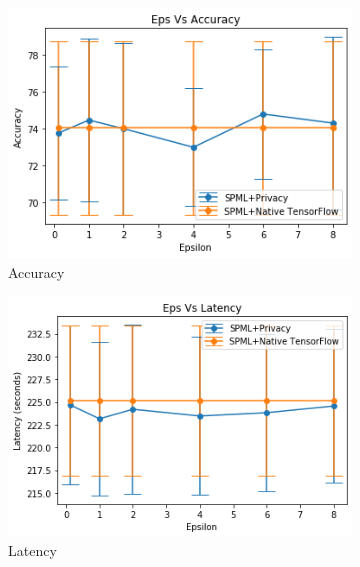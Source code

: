 \begin{figure}
\begin{subfigure}{0.5\textwidth}
         \includegraphics[width=\textwidth]{images/RR/simAccuracy.png}
         \caption{Accuracy}
         \label{fig:simRRAccuracyInference}
     \end{subfigure}
     \begin{subfigure}{0.5\textwidth}
         \includegraphics[width=\textwidth]{images/RR/simLatency.png}
         \caption{Latency}
         \label{fig:simRRLatencyInference}
     \end{subfigure}
        \caption{Randomized response - Training - Simulation mode without Intel SGX and with SCONE}
     \begin{subfigure}{0.5\textwidth}

\end{subfigure}
\end{figure}
